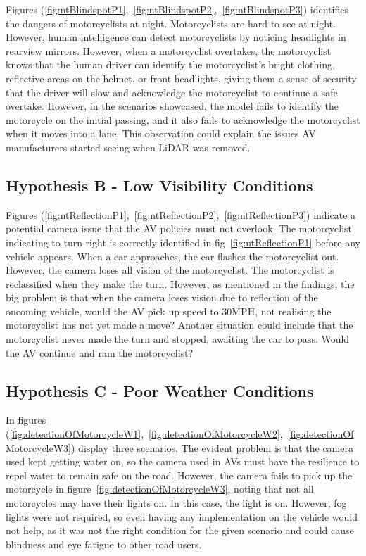 \documentclass[12pt]{report} %
\begin{document}
		Figures (\ref{fig:ntBlindspotP1},~\ref{fig:ntBlindspotP2},~\ref{fig:ntBlindspotP3}) identifies the dangers of motorcyclists at night. Motorcyclists are hard to see at night. However, human intelligence can detect motorcyclists by noticing headlights in rearview mirrors. However, when a motorcyclist overtakes, the motorcyclist knows that the human driver can identify the motorcyclist's bright clothing, reflective areas on the helmet, or front headlights, giving them a sense of security that the driver will slow and acknowledge the motorcyclist to continue a safe overtake. However, in the scenarios showcased, the model fails to identify the motorcycle on the initial passing, and it also fails to acknowledge the motorcyclist when it moves into a lane. This observation could explain the issues AV manufacturers started seeing when LiDAR was removed.

	\subsection*{Hypothesis B - Low Visibility Conditions}
		Figures (\ref{fig:ntReflectionP1},~\ref{fig:ntReflectionP2},~\ref{fig:ntReflectionP3}) indicate a potential camera issue that the AV policies must not overlook. The motorcyclist indicating to turn right is correctly identified in fig~\ref{fig:ntReflectionP1} before any vehicle appears. When a car approaches, the car flashes the motorcyclist out. However, the camera loses all vision of the motorcyclist. The motorcyclist is reclassified when they make the turn. However, as mentioned in the findings, the big problem is that when the camera loses vision due to reflection of the oncoming vehicle, would the AV pick up speed to 30MPH, not realising the motorcyclist has not yet made a move? Another situation could include that the motorcyclist never made the turn and stopped, awaiting the car to pass. Would the AV continue and ram the motorcyclist?


	\subsection*{Hypothesis C - Poor Weather Conditions}
		In figures (\ref{fig:detectionOfMotorcycleW1},~\ref{fig:detectionOfMotorcycleW2},~\ref{fig:detectionOfMotorcycleW3}) display three scenarios. The evident problem is that the camera used kept getting water on, so the camera used in AVs must have the resilience to repel water to remain safe on the road. However, the camera fails to pick up the motorcycle in figure~\ref{fig:detectionOfMotorcycleW3}, noting that not all motorcycles may have their lights on. In this case, the light is on. However, fog lights were not required, so even having any implementation on the vehicle would not help, as it was not the right condition for the given scenario and could cause blindness and eye fatigue to other road users.
\end{document}
